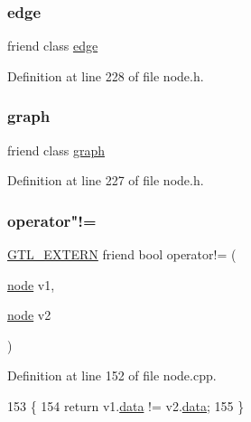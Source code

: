 \subsubsection{\texorpdfstring{edge}{edge}}
{\footnotesize\ttfamily friend class \mbox{\hyperlink{classedge}{edge}}\hspace{0.3cm}{\ttfamily [friend]}}



Definition at line 228 of file node.\+h.

\mbox{\label{classnode_ab8b0dbc1b36724e5e4635ac651c218cb}} 
\subsubsection{\texorpdfstring{graph}{graph}}
{\footnotesize\ttfamily friend class \mbox{\hyperlink{classgraph}{graph}}\hspace{0.3cm}{\ttfamily [friend]}}



Definition at line 227 of file node.\+h.

\mbox{\label{classnode_a57d3666e4a9d57001d86b18da29bc174}} 
\subsubsection{\texorpdfstring{operator"!=}{operator!=}}
{\footnotesize\ttfamily \mbox{\hyperlink{_g_t_l_8h_a014cd1e9b3e67a78ae433eda95c8fd25}{G\+T\+L\+\_\+\+E\+X\+T\+E\+RN}} friend bool operator!= (\begin{DoxyParamCaption}\item[{\mbox{\hyperlink{classnode}{node}}}]{v1,  }\item[{\mbox{\hyperlink{classnode}{node}}}]{v2 }\end{DoxyParamCaption})\hspace{0.3cm}{\ttfamily [friend]}}



Definition at line 152 of file node.\+cpp.


\begin{DoxyCode}
153 \{
154     \textcolor{keywordflow}{return} v1.\mbox{\hyperlink{classnode_a4ae3d54ebb61be3a102bedf5b91bef75}{data}} != v2.\mbox{\hyperlink{classnode_a4ae3d54ebb61be3a102bedf5b91bef75}{data}};
155 \}
\end{DoxyCode}
\mbox{\label{classnode_a3a5ba8f74b565f5fc4d409d3d350320e}} 
